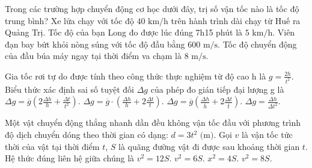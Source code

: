 \begin{ex}%
	Trong các trường hợp chuyển động cơ học dưới đây, trị số vận tốc nào là tốc độ trung bình?
	\choice
	{\True Xe lửa chạy với tốc độ $40\text{ km/h}$ trên hành trình dài chạy từ Huế ra Quảng Trị.}
	{Tốc độ của bạn Long đo được lúc đúng 7h15 phút là $5\text{ km/h}$.}
	{Viên đạn bay bứt khỏi nòng súng với tốc độ đầu bằng $600\text{ m/s}$.}
	{Tốc độ chuyển động của đầu búa máy ngay tại thời điểm va chạm là $8\text{ m/s}$.}
\end{ex}

\begin{ex}%
	Gia tốc rơi tự do được tính theo công thức thực nghiệm từ độ cao h là $g=\frac{2h}{t^2}$. Biểu thức xác định sai số tuyệt đối $\Delta g$ của phép đo gián tiếp đại lượng g là
	\choice
	{$\Delta g=\overline{g}\left(2\frac{\Delta h}{h}+\frac{\Delta t}{t^2}\right)$.}
	{$\Delta g=\overline{g}\cdot\left(\frac{\Delta h}{h}+2\frac{\Delta t}{t}\right)$.}
	{\True $\Delta g=\overline{g}\left(\frac{\Delta h}{\overline{h}}+2\frac{\Delta t}{\overline{t}}\right)$.}
	{$\Delta g=\frac{\Delta h}{\Delta t^2}$.}
\end{ex}

\begin{ex}%
	Một vật chuyển động thẳng nhanh dần đều không vận tốc đầu với phương trình độ dịch chuyển dóng theo thời gian có dạng: $d=3t^2\text{ (m)}$. Gọi $v$ là vận tốc tức thời của vật tại thời điểm $t$, $S$ là quãng đường vật đi được sau khoảng thời gian $t$. Hệ thức đúng liên hệ giữa chúng là
	\choice
	{\True $v^2=12S$.}
	{$v^2=6S$.}
	{$x^2=4S$.}
	{$v^2=8S$.}
\end{ex}


